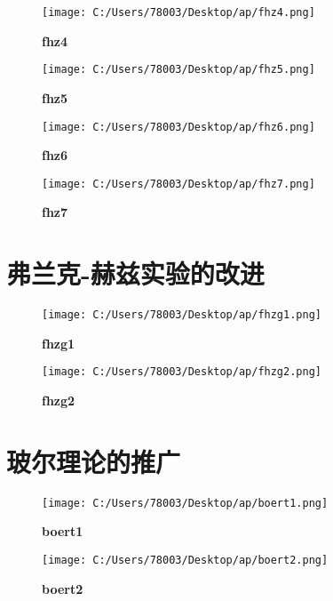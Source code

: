 \documentclass[UTF8]{report}
\theoremstyle{MyLineTheoremStyle} %
\theoremstyle{MyBlockTheoremStyle} %
\theoremstyle{MySubsubsectionStyle} %
\begin{document}
\begin{figure}[ht]
    \centering
    \texttt{[image: C:/Users/78003/Desktop/ap/fhz4.png]}
    \caption{\textbf{fhz4}}
    \label{fig:fhz4}
\end{figure}

\begin{figure}[ht]
    \centering
    \texttt{[image: C:/Users/78003/Desktop/ap/fhz5.png]}
    \caption{\textbf{fhz5}}
    \label{fig:fhz5}
\end{figure}

\begin{figure}[ht]
    \centering
    \texttt{[image: C:/Users/78003/Desktop/ap/fhz6.png]}
    \caption{\textbf{fhz6}}
    \label{fig:fhz6}
\end{figure}

\begin{figure}[ht]
    \centering
    \texttt{[image: C:/Users/78003/Desktop/ap/fhz7.png]}
    \caption{\textbf{fhz7}}
    \label{fig:fhz7}
\end{figure}

\cleardoublepage
\section{弗兰克-赫兹实验的改进}

\begin{figure}[ht]
    \centering
    \texttt{[image: C:/Users/78003/Desktop/ap/fhzg1.png]}
    \caption{\textbf{fhzg1}}
    \label{fig:fhzg1}
\end{figure}

\begin{figure}[ht]
    \centering
    \texttt{[image: C:/Users/78003/Desktop/ap/fhzg2.png]}
    \caption{\textbf{fhzg2}}
    \label{fig:fhzg2}
\end{figure}

\cleardoublepage
\section{玻尔理论的推广}

\begin{figure}[ht]
    \centering
    \texttt{[image: C:/Users/78003/Desktop/ap/boert1.png]}
    \caption{\textbf{boert1}}
    \label{fig:boert1}
\end{figure}

\begin{figure}[ht]
    \centering
    \texttt{[image: C:/Users/78003/Desktop/ap/boert2.png]}
    \caption{\textbf{boert2}}
    \label{fig:boert2}
\end{figure}
\end{document}
